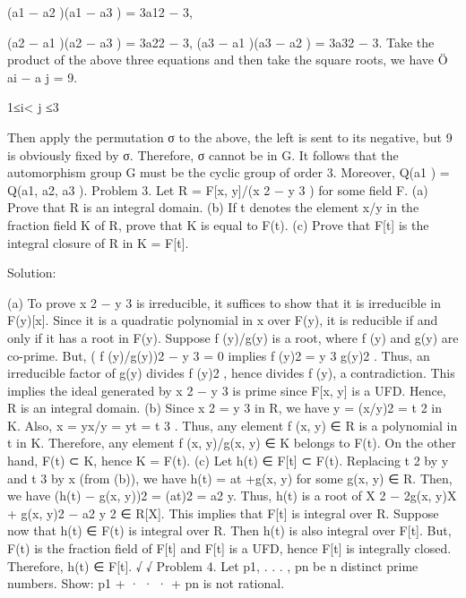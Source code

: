 \documentclass[UTF8,12pt]{ctexart}
\begin{document}
(a1 − a2 )(a1 − a3 ) = 3a12 − 3,

(a2 − a1 )(a2 − a3 ) = 3a22 − 3, (a3 − a1 )(a3 − a2 ) = 3a32 − 3. Take the product of the above three equations and then take the square roots, we have Ö ai − a j = 9.

1≤i< j ≤3

Then apply the permutation σ to the above, the left is sent to its negative, but 9 is obviously fixed by σ. Therefore, σ cannot be in G. It follows that the automorphism group G must be the cyclic group of order 3. Moreover, Q(a1 ) = Q(a1, a2, a3 ). Problem 3. Let R = F[x, y]/(x 2 − y 3 ) for some field F. (a) Prove that R is an integral domain. (b) If t denotes the element x/y in the fraction field K of R, prove that K is equal to F(t). (c) Prove that F[t] is the integral closure of R in K = F[t].

Solution:

(a) To prove x 2 − y 3 is irreducible, it suffices to show that it is irreducible in F(y)[x]. Since it is a quadratic polynomial in x over F(y), it is reducible if and only if it has a root in F(y). Suppose f (y)/g(y) is a root, where f (y) and g(y) are co-prime. But, ( f (y)/g(y))2 − y 3 = 0 implies f (y)2 = y 3 g(y)2 . Thus, an irreducible factor of g(y) divides f (y)2 , hence divides f (y), a contradiction. This implies the ideal generated by x 2 − y 3 is prime since F[x, y] is a UFD. Hence, R is an integral domain. (b) Since x 2 = y 3 in R, we have y = (x/y)2 = t 2 in K. Also, x = yx/y = yt = t 3 . Thus, any element f (x, y) ∈ R is a polynomial in t in K. Therefore, any element f (x, y)/g(x, y) ∈ K belongs to F(t). On the other hand, F(t) ⊂ K, hence K = F(t). (c) Let h(t) ∈ F[t] ⊂ F(t). Replacing t 2 by y and t 3 by x (from (b)), we have h(t) = at +g(x, y) for some g(x, y) ∈ R. Then, we have (h(t) − g(x, y))2 = (at)2 = a2 y. Thus, h(t) is a root of X 2 − 2g(x, y)X + g(x, y)2 − a2 y 2 ∈ R[X]. This implies that F[t] is integral over R. Suppose now that h(t) ∈ F(t) is integral over R. Then h(t) is also integral over F[t]. But, F(t) is the fraction field of F[t] and F[t] is a UFD, hence F[t] is integrally closed. Therefore, h(t) ∈ F[t]. √ √ Problem 4. Let p1, . . . , pn be n distinct prime numbers. Show: p1 + · · · + pn is not rational.
\end{document}
